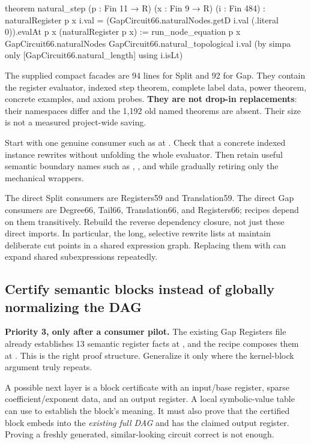 \begin{Lean}
theorem natural_step (p : Fin 11 → R) (x : Fin 9 → R) (i : Fin 484) :
    naturalRegister p x i.val =
      (GapCircuit66.naturalNodes.getD i.val (.literal 0)).evalAt p x
        (naturalRegister p x) :=
  run_node_equation p x GapCircuit66.naturalNodes
    GapCircuit66.natural_topological i.val
    (by simpa only [GapCircuit66.natural_length] using i.isLt)
\end{Lean}

The supplied compact facades are 94 lines for Split and 92 for Gap. They
contain the register evaluator, indexed step theorem, complete label data,
power theorem, concrete examples, and axiom probes. \textbf{They are not
drop-in replacements}: their namespaces differ and the 1,192 old named
theorems are absent. Their size is not a measured project-wide saving.

Start with one genuine consumer such as
 at
. Check that a concrete indexed
instance rewrites without unfolding the whole evaluator. Then retain useful
semantic boundary names such as ,
, and 
while gradually retiring only the mechanical wrappers.

The direct Split consumers are Registers59 and Translation59. The direct
Gap consumers are Degree66, Tail66, Translation66, and Registers66; recipes
depend on them transitively. Rebuild the reverse dependency closure, not
just these direct imports. In particular, the long, selective rewrite lists
at  maintain deliberate cut points
in a shared expression graph. Replacing them with 
can expand shared subexpressions repeatedly.

\subsection{Certify semantic blocks instead of globally normalizing the DAG}

\textbf{Priority 3, only after a consumer pilot.} The existing Gap Registers
file already establishes 13 semantic register facts at
, and the recipe composes them at
. This is the right proof structure.
Generalize it only where the kernel-block argument truly repeats.

A possible next layer is a block certificate with an input/base register,
sparse coefficient/exponent data, and an output register. A local
symbolic-value table can use  to establish
the block's meaning. It must also prove that the certified block embeds into
the \emph{existing full DAG} and has the claimed output register. Proving a
freshly generated, similar-looking circuit correct is not enough.

